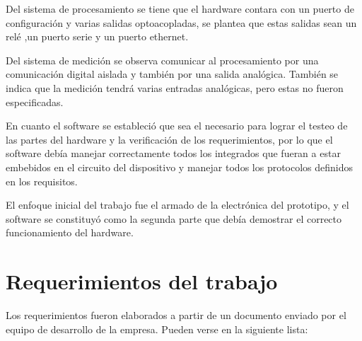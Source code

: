 Del sistema de procesamiento se tiene que el hardware contara con un puerto de configuración y varias salidas optoacopladas, se plantea que estas salidas sean un relé ,un puerto serie y un puerto ethernet.

Del sistema de medición se observa comunicar al procesamiento por una comunicación digital aislada y también por una salida analógica. También se indica que la medición tendrá varias entradas analógicas, pero estas no fueron especificadas.

En cuanto el software se estableció que sea el necesario para lograr el testeo de las partes del hardware y la verificación de los requerimientos, por lo que el software debía manejar correctamente todos los integrados que fueran a estar embebidos en el circuito del dispositivo y manejar todos los protocolos definidos en los requisitos.

El enfoque inicial del trabajo fue el armado de la electrónica del prototipo, y el software se constituyó como la segunda parte que debía demostrar el correcto funcionamiento del hardware.

\section{Requerimientos del trabajo}
\label{sec:cap2parte2}
Los requerimientos fueron elaborados a partir de un documento enviado por el equipo de desarrollo de la empresa. Pueden verse en la siguiente lista:

